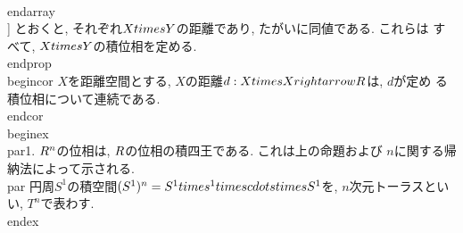   \\end{array}
 \\]
 とおくと, それぞれ$X\\times Y$の距離であり, たがいに同値である. これらは
 すべて, $X\\times Y$の積位相を定める.
\\end{prop}
\\begin{cor}
 $X$を距離空間とする, $X$の距離$d:X\\times X\\rightarrow \\R$は, $d$が定め
 る積位相について連続である.
\\end{cor}
\\begin{ex}
 {}
\\par1. $\\R^{n}$の位相は, $\\R$の位相の積四王である. これは上の命題および
 $n$に関する帰納法によって示される.
 \\par 円周$S^{1}$の積空間$(S^{1})^{n}=S^{1}\\times ^{1}\\times\\cdots\\times
 S^{1}$を, $n$次元トーラスといい, $T^{n}$で表わす.
\\end{ex}

